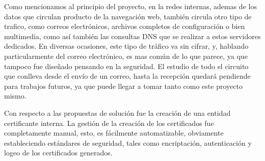 Como mencionamos al principio del proyecto, en la redes internas, ademas de
los datos que circulan producto de la navegación web, también circula
otro tipo de trafico, como correos electrónicos, archivos completos de 
configuración o bien multimedia, como así también las consultas DNS que 
se realizar a estos servidores dedicados. En diversas ocasiones, este 
tipo de tráfico va sin cifrar, y, hablando particularmente del correo electrónico,
es mas común de lo que parece, ya que tampoco fue diseñado pensando en la 
seguridad. El estudio de todo el circuito que conlleva desde el envío de 
un correo, hasta la recepción quedará pendiende para trabajos futuros, 
ya que puede llegar a tomar tanto como este proyecto mismo.

Con respecto a las propuestas de solución fue la creación de una entidad 
certificante
interna. La gestión de la creación de los certificados fue completamente 
manual, esto, es fácilmente automatizable, obviamente estableciendo estándares 
de seguridad, tales como encriptación, autenticación y logeo de los 
certificados generados.